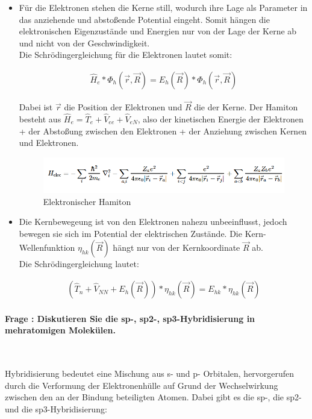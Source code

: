 \documentclass[a4paper, 11pt, ngerman, parskip=half-]{scrartcl}
\newcounter{question}
\newcommand{\question}[1]{\stepcounter{question}\paragraph{Frage \thequestion: #1}~}
\begin{document}
\begin{itemize}
    \item Für die Elektronen stehen die Kerne still, wodurch ihre Lage als Parameter in das anziehende und abstoßende Potential eingeht.
        Somit hängen die elektronischen Eigenzustände und Energien nur von der Lage der Kerne ab und nicht von der Geschwindigkeit.\\
            Die Schrödingergleichung für die Elektronen lautet somit:
            
        \begin{align}
            \hat{H}_e * \Phi_h(\vec{r},\vec{R}) = E_h(\vec{R}) *  \Phi_h(\vec{r},\vec{R})
        \end{align}

        Dabei ist $\vec{r}$ die Position der Elektronen und $\vec{R}$ die der Kerne. Der Hamiton besteht aus $\hat{H}_e = \hat{T}_e + \hat{V}_{ee} + \hat{V}_{eN}$, 
        also der kinetischen Energie der Elektronen + der Abstoßung zwischen den Elektronen + der Anziehung zwischen Kernen und Elektronen.

        \begin{figure}[H]
            \includegraphics[width=0.8\linewidth]{resources/09-05-2012/born_op.PNG}
            \caption{Elektronischer Hamiton}
        \end{figure}

    \item Die Kernbewegeung ist von den Elektronen nahezu unbeeinflusst, jedoch bewegen sie sich im Potential der elektrischen Zustände. 
        Die Kern-Wellenfunktion $\eta_{hk}(\vec{R})$ hängt nur von der Kernkoordinate $\vec{R}$ ab.\\
        Die Schrödingergleichung lautet: 

        \begin{align}
            (\hat{T}_n + \hat{V}_{NN} + E_h(\vec{R})) * \eta_{hk}(\vec{R}) = E_{hk} * \eta_{hk}(\vec{R})
        \end{align}
\end{itemize}


\question{Diskutieren Sie die sp-, sp2-, sp3-Hybridisierung in mehratomigen Molekülen.}
\label{q:62}

Hybridisierung bedeutet eine Mischung aus s- und p- Orbitalen,
hervorgerufen durch die Verformung der Elektronenhülle auf Grund
der Wechselwirkung zwischen den an der Bindung beteiligten Atomen.
Dabei gibt es die sp-, die sp2- und die sp3-Hybridisierung:
\end{document}
